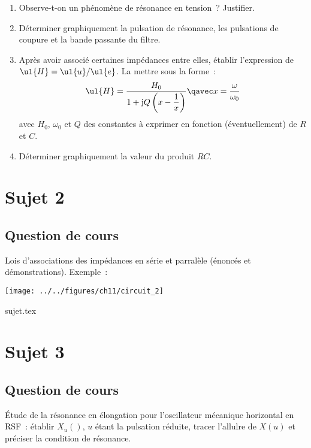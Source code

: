 \documentclass[a4paper, 11pt]{book}
\begin{document}
\begin{enumerate}[start=2]
    \item Observe-t-on un phénomène de résonance en tension~? Justifier.
    \item Déterminer graphiquement la pulsation de résonance, les pulsations de
        coupure et la bande passante du filtre.
    \item Après avoir associé certaines impédances entre elles, établir
        l'expression de $\ul{H} = \ul{u} / \ul{e}$. La
        mettre sous la forme~:
        \[
            \ul{H}
                = \dfrac{H_0}{1 + {\rm j} Q\left(x - \dfrac{1}{x}\right)}
            \qavec
            x = \dfrac{\omega}{\omega_0}
        \]
        avec $H_0$, $\omega_0$ et $Q$ des constantes à exprimer en fonction
        (éventuellement) de $R$ et $C$.
    \item Déterminer graphiquement la valeur du produit $RC$.
\end{enumerate}

\chapter{Sujet 2}
\section{Question de cours}

Lois d'associations des impédances en série et parralèle (énoncés et
démonstrations). Exemple~:
\begin{center}
    \texttt{[image: ../../figures/ch11/circuit\_2]}
\end{center}

\resetQ
{sujet.tex}

\chapter{Sujet 3}
\section{Question de cours}

Étude de la résonance en élongation pour l'oscillateur mécanique horizontal en
RSF~: établir $X_u()$, $u$ étant la pulsation réduite, tracer l'allulre de
$X(u)$ et préciser la condition de résonance.
\end{document}

